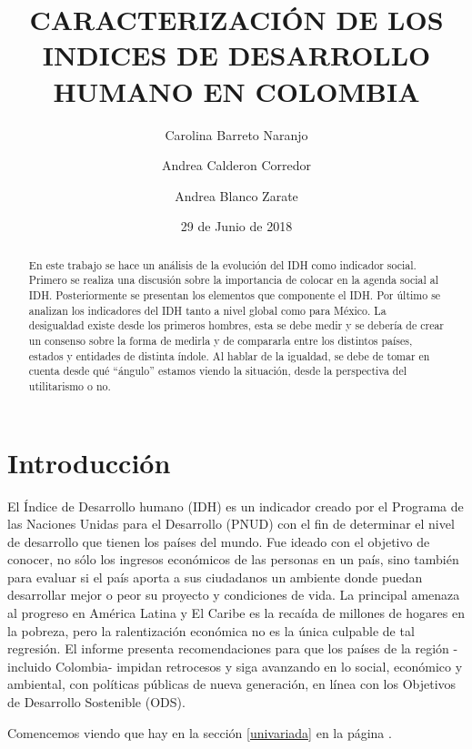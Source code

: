 \documentclass{article}
\title{CARACTERIZACIÓN DE LOS INDICES DE DESARROLLO HUMANO EN COLOMBIA}
\author[1]{\normalsize Carolina Barreto Naranjo}
\author[2]{\normalsize Andrea Calderon Corredor}
\author[3]{\normalsize Andrea Blanco Zarate}
\affil[1,2,3]{\small  Facultad de Ingeniería,Universidad de los Andes\\
\texttt{{c.barreto805,a.calderon,a.blanco}@uniandes.edu.co}}
\affil[1,2,3]{\small Herramientas Computacionales para la Investigación\\}
\date{29 de Junio de 2018}
\begin{document}


\maketitle


\begin{abstract}
En este trabajo se hace un análisis de la evolución del IDH como indicador social. Primero se realiza una discusión sobre la importancia de colocar en la agenda social al IDH. Posteriormente se presentan los elementos que componente el IDH. Por último se analizan los indicadores del IDH tanto a nivel global como para México. La desigualdad existe desde los primeros hombres, esta se debe medir y se debería de crear un consenso sobre la forma de medirla y de compararla entre los distintos países, estados y entidades de distinta índole. Al hablar de la igualdad, se debe de tomar en cuenta desde qué “ángulo” estamos viendo la situación, desde la perspectiva del utilitarismo o no.
\end{abstract}

\section*{Introducción}

El Índice de Desarrollo humano (IDH) es un indicador creado por el Programa de las Naciones Unidas para el Desarrollo (PNUD) con el fin de determinar el nivel de desarrollo que tienen los países del mundo.  Fue ideado con el objetivo de conocer, no sólo los ingresos económicos de las personas en un país, sino también para evaluar si el país aporta a sus ciudadanos un ambiente donde puedan desarrollar mejor o peor su proyecto y condiciones de vida. La principal amenaza al progreso en América Latina y El Caribe es la recaída de millones de hogares en la pobreza, pero la ralentización económica no es la única culpable de tal regresión. El informe presenta recomendaciones para que los países de la región -incluido Colombia- impidan retrocesos y siga avanzando en lo social, económico y ambiental, con políticas públicas de nueva generación, en línea con los Objetivos de Desarrollo Sostenible (ODS).
 
Comencemos viendo que hay en la sección \ref{univariada} en la página \pageref{univariada}.

\clearpage



\clearpage



\clearpage


\clearpage





\renewcommand{\refname}{Bibliografia}

\end{document}
